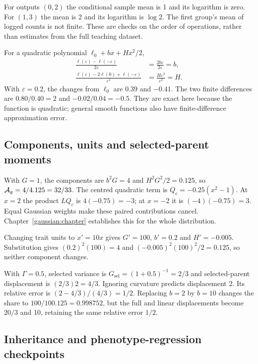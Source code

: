 For outputs $(0,2)$ the conditional sample mean is 1 and its logarithm is zero. For $(1,3)$ the mean is 2 and its logarithm is $\log2$. The first group's mean of logged counts is not finite. These are checks on the order of operations, rather than estimates from the full teaching dataset.

For a quadratic polynomial $\ell_0+bx+Hx^2/2$,
\begin{align}
 \frac{\ell(\varepsilon)-\ell(-\varepsilon)}{2\varepsilon}
 &=\frac{2b\varepsilon}{2\varepsilon}=b,\\
 \frac{\ell(\varepsilon)-2\ell(0)+\ell(-\varepsilon)}{\varepsilon^2}
 &=\frac{H\varepsilon^2}{\varepsilon^2}=H.
\end{align}
With $\varepsilon=0.2$, the changes from $\ell_0$ are $0.39$ and $-0.41$.
The two finite differences are $0.80/0.40=2$ and $-0.02/0.04=-0.5$.
They are exact here because the function is quadratic; general smooth functions also have finite-difference approximation error.

\subsection{Components, units and selected-parent moments}

With $G=1$, the components are $b^2G=4$ and $H^2G^2/2=0.125$, so
$\mathcal A_g=4/4.125=32/33$. The centred quadratic term is
$Q_c=-0.25(x^2-1)$. At $x=2$ the product $LQ_c$ is $4(-0.75)=-3$; at
$x=-2$ it is $(-4)(-0.75)=3$. Equal Gaussian weights make these paired contributions cancel. Chapter~\ref{gaussian:chapter} establishes this for the whole distribution.

Changing trait units to $x'=10x$ gives $G'=100$, $b'=0.2$ and $H'=-0.005$.
Substitution gives $(0.2)^2(100)=4$ and
$(-0.005)^2(100)^2/2=0.125$, so neither component changes.

With $\Gamma=0.5$, selected variance is
$G_{\mathrm{sel}}=(1+0.5)^{-1}=2/3$ and selected-parent displacement is
$(2/3)2=4/3$. Ignoring curvature predicts displacement 2. Its relative error is
$(2-4/3)/(4/3)=1/2$. Replacing $b=2$ by $b=10$ changes the share to
$100/100.125=0.998752$, but the full and linear displacements become
$20/3$ and 10, retaining the same relative error $1/2$.

\subsection{Inheritance and phenotype-regression checkpoints}

